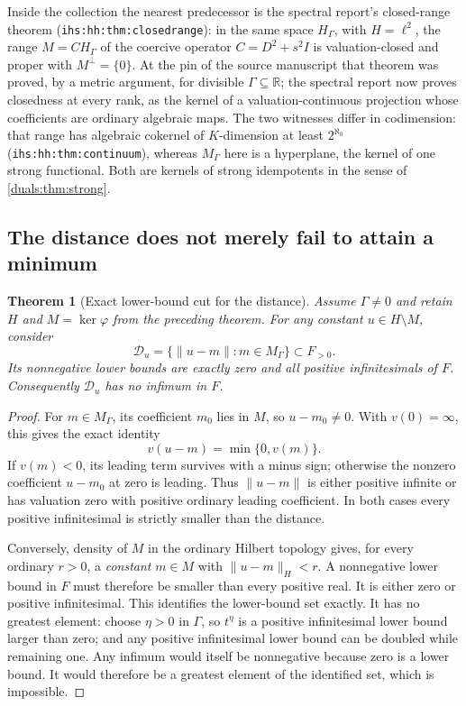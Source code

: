 \documentclass[11pt,letterpaper]{article}
\numberwithin{equation}{section}
\newtheorem{theorem}{Theorem}[section]
\theoremstyle{definition}
\theoremstyle{remark}
\newcommand{\R}{\mathbb R}
\newcommand{\HG}{H_\Gamma}
\newcommand{\norm}[1]{\lVert#1\rVert}
\newcommand{\ihs}[1]{\texttt{ihs:#1}}
\begin{document}
Inside the collection the nearest predecessor is the spectral report's
closed-range theorem (\ihs{hh:thm:closedrange}): in the same space
$\HG$, with $H=\ell^2$, the range $M=C\HG$ of the coercive operator
$C=D^2+s^2I$ is valuation-closed and proper with $M^\perp=\{0\}$. At the
pin of the source manuscript that theorem was proved, by a metric
argument, for divisible $\Gamma\subseteq\R$; the spectral report now proves
closedness at every rank, as the kernel of a valuation-continuous
projection whose coefficients are ordinary algebraic maps. The two
witnesses differ in codimension: that range has algebraic cokernel of
$K$-dimension at least $2^{\aleph_0}$ (\ihs{hh:thm:continuum}), whereas $M_\Gamma$ here is a hyperplane, the
kernel of one strong functional. Both are kernels of strong idempotents in
the sense of \cref{duals:thm:strong}.

\subsection{The distance does not merely fail to attain a minimum}
\begin{theorem}[Exact lower-bound cut for the distance]
\label{duals:thm:distance}
Assume $\Gamma\ne0$ and retain $H$ and $M=\ker\varphi$ from the
preceding theorem. For any constant $u\in H\setminus M$, consider
\[
 \mathcal D_u=\{\norm{u-m}:m\in M_\Gamma\}\subset F_{>0}.
\]
Its nonnegative lower bounds are exactly zero and all positive
infinitesimals of $F$. Consequently $\mathcal D_u$ has no infimum in
$F$.
\end{theorem}
\begin{proof}
For $m\in M_\Gamma$, its coefficient $m_0$ lies in $M$, so
$u-m_0\ne0$. With $v(0)=\infty$, this gives the exact identity
\[
 v(u-m)=\min\{0,v(m)\}.
\]
If $v(m)<0$, its leading term survives with a minus sign; otherwise
the nonzero coefficient $u-m_0$ at zero is leading. Thus
$\norm{u-m}$ is either positive infinite or has valuation zero
with positive ordinary leading coefficient. In both cases every
positive infinitesimal is strictly smaller than the distance.

Conversely, density of $M$ in the ordinary Hilbert topology gives,
for every ordinary $r>0$, a \emph{constant} $m\in M$ with
$\norm{u-m}_H<r$. A nonnegative lower bound in $F$ must therefore be
smaller than every positive real. It is either zero or positive
infinitesimal. This identifies the lower-bound set exactly.
It has no greatest element: choose $\eta>0$ in $\Gamma$, so
$t^\eta$ is a positive infinitesimal lower bound larger than zero;
and any positive infinitesimal lower bound can be doubled while
remaining one. Any infimum would itself be nonnegative because zero
is a lower bound. It would therefore be a greatest element of the
identified set, which is impossible.
\end{proof}
\end{document}
